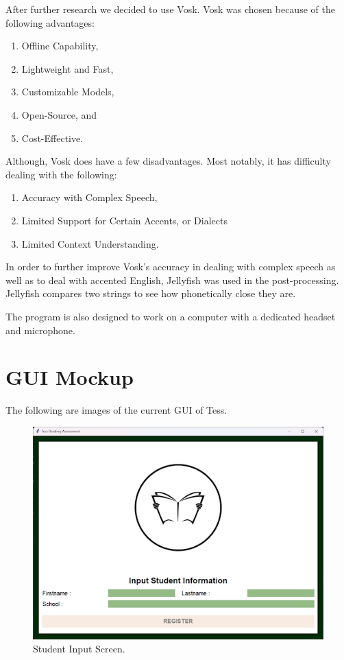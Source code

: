 After further research we decided to use Vosk. Vosk was chosen because of the following advantages:
\begin{enumerate}
\item Offline Capability,
\item Lightweight and Fast,
\item Customizable Models,
\item Open-Source, and 
\item Cost-Effective.
\end{enumerate}

Although, Vosk does have a few disadvantages. Most notably, it has difficulty dealing with the following:
\begin{enumerate}
    \item Accuracy with Complex Speech,
    \item Limited Support for Certain Accents, or Dialects
    \item Limited Context Understanding.
\end{enumerate}

In order to further improve Vosk’s accuracy in dealing with complex speech as well as to deal with accented English, Jellyfish was used in the post-processing. Jellyfish compares two strings to see how phonetically close they are.

The program is also designed to work on a computer with a dedicated headset and microphone.

\section{GUI Mockup}
The following are images of the current GUI of Tess.

\begin{figure}[h]
   \centering
   \includegraphics[scale = 0.6]{figures/Student-Input-Screen.png}
   \caption{Student Input Screen.}
    \label{fig:studentInput}
\end{figure}

